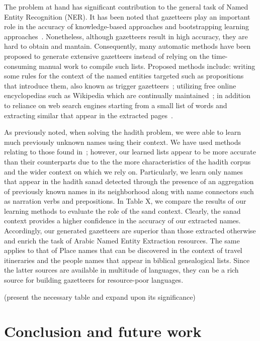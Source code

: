 \documentclass{llncs}
\begin{document}
The problem at hand has significant contribution to the general task of Named Entity Recognition (NER). It has been noted that
gazetteers play an important role in the accuracy of knowledge-based approaches and bootstrapping learning
approaches~\cite{Kozareva:06,Carlson:09,Toral:06,Benajiba:07,Kazama:08,Nadeau:06}. Nonetheless, although gazetteers result in high accuracy,
they are hard to obtain and mantain. %
Consequently, many automatic methods have been proposed to generate extensive gazetteers instead of relying on the time-consuming manual work
to compile such lists. Proposed methods include: writing some rules for the context of the named entities targeted such as propositions that
introduce them, also known as trigger gazetteers~\cite{Kozareva:06,Toral:06}; utilizing free online encyclopedias such as Wikipedia which are 
continually maintained~\cite{Benajiba:07,Kazama:08}; in addition to reliance on web search engines starting from a small list of words and extracting
similar that appear in the extracted pages~\cite{Nadeau:06}.

As previously noted, when solving the hadith problem, we were able to learn much previously unknown names using their context. We have used methods
relating to those found in~\cite{Traboulsi:09,Kozareva:06}; however, our learned lists appear to be more accurate than their counterparts due to the
the more characteristics of the hadith corpus and the wider context on which we rely on. Particularly, we learn only names that appear in the hadith sanad
detected through the presence of an aggregation of previously known names in its neighborhood along with name connectors such as narration verbs and 
prepositions. In Table X, we compare the results of our learning methods to evaluate the role of the sand context. Clearly, the sanad context provides 
a higher confidence in the accuracy of our extracted names. Accordingly, our generated gazetteers are superior than those extracted otherwise and 
enrich the task of Arabic Named Entity Extraction resources. The same applies to that of Place names that can be discovered in the context of travel
itineraries and the people names that appear in biblical genealogical lists. Since the latter sources are available in multitude of languages, they
can be a rich source for building gazetteers for resource-poor languages.

(present the necessary table and expand upon its significance)

\section{Conclusion and future work}
\label{sec:future}
\end{document}
